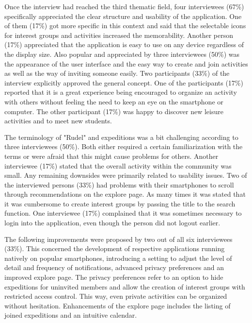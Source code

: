 \documentclass[12pt,numbers=noenddot,parskip,bibliography=totocnumbered,listof=totocnumbered,draft]{scrreprt}
\begin{document}
Once the interview had reached the third thematic field, four interviewees (67\%) specifically appreciated the clear structure and usability of the application. One of them (17\%) got more specific in this context and said that the selectable icons for interest groups and activities increased the memorability. Another person (17\%) appreciated that the application is easy to use on any device regardless of the display size. Also popular and appreciated by three interviewees (50\%) was the appearance of the user interface and the easy way to create and join activities as well as the way of inviting someone easily. Two participants (33\%) of the interview explicitly approved the general concept. One of the participants (17\%) reported that it is a great experience being encouraged to organize an activity with others without feeling the need to keep an eye on the smartphone or computer. The other participant (17\%) was happy to discover new leisure activities and to meet new students.

The terminology of "Rudel" and expeditions was a bit challenging according to three interviewees (50\%). Both either required a certain familiarization with the terms or were afraid that this might cause problems for others. Another interviewee (17\%) stated that the overall activity within the community was small. Any remaining downsides were primarily related to usability issues. Two of the interviewed persons (33\%) had problems with their smartphones to scroll through recommendations on the explore page. As many times it was stated that it was cumbersome to create interest groups by passing the title to the search function. One interviewee (17\%) complained that it was sometimes necessary to login into the application, even though the person did not logout earlier.

The following improvements were proposed by two out of all six interviewees (33\%). This concerned the development of respective applications running natively on popular smartphones, introducing a setting to adjust the level of detail and frequency of notifications, advanced privacy preferences and an improved explore page. The privacy preferences refer to an option to hide expeditions for uninvited members and allow the creation of interest groups with restricted access control. This way, even private activities can be organized without hesitation. Enhancements of the explore page includes the listing of joined expeditions and an intuitive calendar. 
\end{document}
